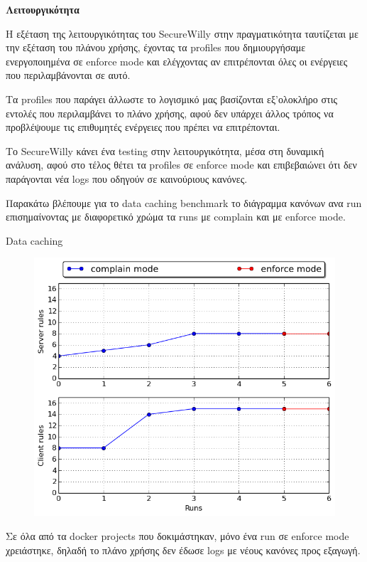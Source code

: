 \hfill\break
\textbf{Λειτουργικότητα}
\hfill\break

Η εξέταση της λειτουργικότητας του \en SecureWilly\gr{} στην πραγματικότητα ταυτίζεται με την εξέταση του πλάνου χρήσης, έχοντας τα \en profiles\gr{} που δημιουργήσαμε ενεργοποιημένα σε \en enforce mode\gr{} και ελέγχοντας αν επιτρέπονται όλες οι ενέργειες που περιλαμβάνονται σε αυτό.

Τα \en profiles\gr{} που παράγει άλλωστε το λογισμικό μας βασίζονται εξ'ολοκλήρο στις εντολές που περιλαμβάνει το πλάνο χρήσης, αφού δεν υπάρχει άλλος τρόπος να προβλέψουμε τις επιθυμητές ενέργειες που πρέπει να επιτρέπονται.

Το \en SecureWilly\gr{} κάνει ένα \en testing\gr{} στην λειτουργικότητα, μέσα στη δυναμική ανάλυση, αφού στο τέλος θέτει τα \en profiles\gr{} σε \en enforce mode\gr{} και επιβεβαιώνει ότι δεν παράγονται νέα \en logs\gr{} που οδηγούν σε καινούριους κανόνες.

Παρακάτω βλέπουμε για το \en data caching benchmark\gr{} το διάγραμμα κανόνων ανα \en run\gr{} επισημαίνοντας με διαφορετικό χρώμα τα \en runs\gr{} με \en complain\gr{} και με \en enforce mode\gr{}.

\begin{center}{\en Data caching\gr{}}\end{center}
\begin{figure}[h!]
  \centering
   \includegraphics[width=0.75\linewidth]{figures/datacaching/complain_enforce_rules.png}
\end{figure}

Σε όλα από τα \en docker projects\gr{} που δοκιμάστηκαν, μόνο ένα \en run\gr{} σε \en enforce mode\gr{} χρειάστηκε, δηλαδή το πλάνο χρήσης δεν έδωσε \en logs\gr{} με νέους κανόνες προς εξαγωγή.

